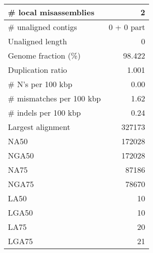 \documentclass[12pt,a4paper]{article}
\begin{document}
\begin{table}[ht]
\begin{center}
\begin{tabular}{|l*{1}{|r}|}
\# local misassemblies & 2 \\ \hline
\# unaligned contigs & 0 + 0 part \\ \hline
Unaligned length & 0 \\ \hline
Genome fraction (\%) & 98.422 \\ \hline
Duplication ratio & 1.001 \\ \hline
\# N's per 100 kbp & 0.00 \\ \hline
\# mismatches per 100 kbp & 1.62 \\ \hline
\# indels per 100 kbp & 0.24 \\ \hline
Largest alignment & 327173 \\ \hline
NA50 & 172028 \\ \hline
NGA50 & 172028 \\ \hline
NA75 & 87186 \\ \hline
NGA75 & 78670 \\ \hline
LA50 & 10 \\ \hline
LGA50 & 10 \\ \hline
LA75 & 20 \\ \hline
LGA75 & 21 \\ \hline
\end{tabular}
\end{center}
\end{table}
\end{document}
